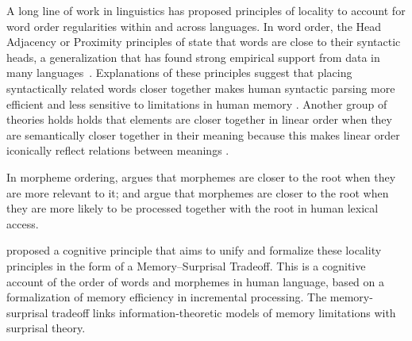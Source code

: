 \documentclass[11pt,letterpaper]{article}
\newcommand{\citep}{\parencite}
\newcommand{\citet}{\Textcite}
\newcommand\mhahn[1]{{\color{red}(#1)}}
\begin{document}
A long line of work in linguistics has proposed principles of locality to account for word order regularities within and across languages.
In word order, the Head Adjacency or Proximity principles of \citet{frazier1985syntactic,rijkhoff-word-1986} state that words are close to their syntactic heads, a generalization that has found strong empirical support from data in many languages~\citep[e.g.][]{hawkins-performance-1994,liu2008dependency, futrell-large-scale-2015-1, liu-dependency-2017}.
Explanations of these principles suggest that placing syntactically related words closer together makes human syntactic parsing more efficient and less sensitive to limitations in human memory \citep{frazier1985syntactic, gibson1998linguistic, hawkins-efficiency-2003, futrell-noisy-context-2017}.
Another group of theories holds holds that elements are closer together in linear order when they are semantically closer together in their meaning because this makes linear order iconically reflect relations between meanings \citep{givon1985iconicity}.

In morpheme ordering, \citet{bybee-morphology-1985} argues that morphemes are closer to the root when they are more relevant to it; \citet{hay2002speech} and \citet{plag2002the} argue that morphemes are closer to the root when they are more likely to be processed together with the root in human lexical access.




\citet{Hahn2020modeling} proposed a cognitive principle that aims to unify and formalize these locality principles in the form of a Memory--Surprisal Tradeoff.
This is a cognitive account of the order of words and morphemes in human language, based on a formalization of memory efficiency in incremental processing.
The memory-surprisal tradeoff links information-theoretic models of memory limitations with surprisal theory.
\end{document}
